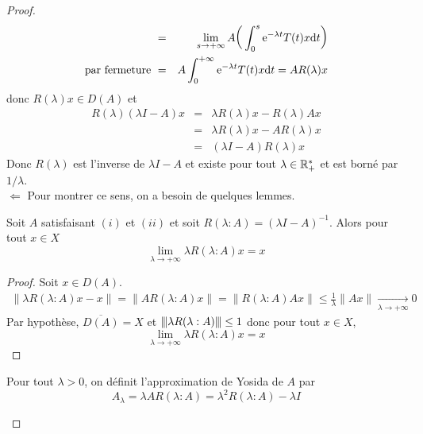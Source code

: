 \begin{proof}
\begin{eqnarray*}
        &=& \lim_{s \to +\infty} A\bigg(\int_0^s \mathrm{e}^{-\lambda t}T(t)x\mathrm{d} t\bigg) \\
        \text{par fermeture } &=& A \int_0^{+\infty}\mathrm{e}^{-\lambda t}T(t)x\mathrm{d} t = AR(\lambda)x
    \end{eqnarray*}
    donc $R(\lambda)x \in D(A)$ et 
    \begin{eqnarray*}
        R(\lambda)(\lambda I-A)x &=& \lambda R(\lambda)x-R(\lambda)Ax \\
        &=& \lambda R(\lambda)x-AR(\lambda)x \\
        &=& (\lambda I -A)R(\lambda)x
    \end{eqnarray*}
    Donc $R(\lambda)$ est l'inverse de $\lambda I-A$ et existe pour tout $\lambda \in \mathbb{R}_+^*$ et est borné par $1/\lambda$.
    \\
    $\boxed{\Longleftarrow}$ Pour montrer ce sens, on a besoin de quelques lemmes.

    \begin{lemme}\label{lemme1_HY}
        Soit $A$ satisfaisant $(i)$ et $(ii)$ et soit $R(\lambda : A)=(\lambda I - A)^{-1}$. Alors pour tout $x \in X$
        \begin{equation*}
            \lim_{\lambda \to +\infty} \lambda R(\lambda : A)x=x
        \end{equation*}
    \end{lemme}

    \begin{proof}
        Soit $x \in D(A)$.
        \begin{eqnarray*}
            \|\lambda R(\lambda:A)x-x\| = \|AR(\lambda: A)x\| = 
            \|R(\lambda:A)Ax\| \leq \frac{1}{\lambda}\|Ax\| \underset{\lambda \to +\infty}{\longrightarrow} 0
        \end{eqnarray*}
        Par hypothèse, $\overline{D(A)}=X$ et ${\left\vert\kern-0.25ex\left\vert \kern-0.25ex\left\vert \lambda R(\lambda :A) \right\vert\kern-0.25ex\right\vert\kern-0.25ex\right\vert} \leq 1$ donc pour tout $x \in X$,
        \begin{equation*}
            \lim_{\lambda \to +\infty} \lambda R(\lambda : A)x=x
        \end{equation*}
    \end{proof}

    \begin{definition}
        Pour tout $\lambda >0$, on définit \textcolor{astral}{l'approximation de Yosida de $A$} par 
        \begin{equation*}
            A_{\lambda} = \lambda AR(\lambda : A)=\lambda^2R(\lambda : A)-\lambda I
        \end{equation*}
    \end{definition}


\end{proof}
